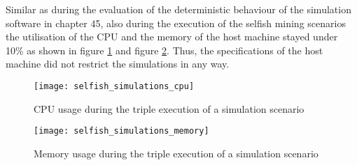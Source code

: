 Similar as during the evaluation of the deterministic behaviour of the simulation software in chapter 45, also during the execution of the selfish mining scenarios the utilisation of the CPU and the memory of the host machine stayed under 10\% as shown in figure \ref{fig:selfish_simulations_cpu} and figure \ref{fig:selfish_simulations_memory}.
Thus, the specifications of the host machine did not restrict the simulations in any way.

\begin{figure}[t]
\texttt{[image: selfish\_simulations\_cpu]}
\centering
\caption{CPU usage during the triple execution of a simulation scenario}
\label{fig:selfish_simulations_cpu}
\end{figure}

\begin{figure}[t]
\texttt{[image: selfish\_simulations\_memory]}
\centering
\caption{Memory usage during the triple execution of a simulation scenario}
\label{fig:selfish_simulations_memory}
\end{figure}
